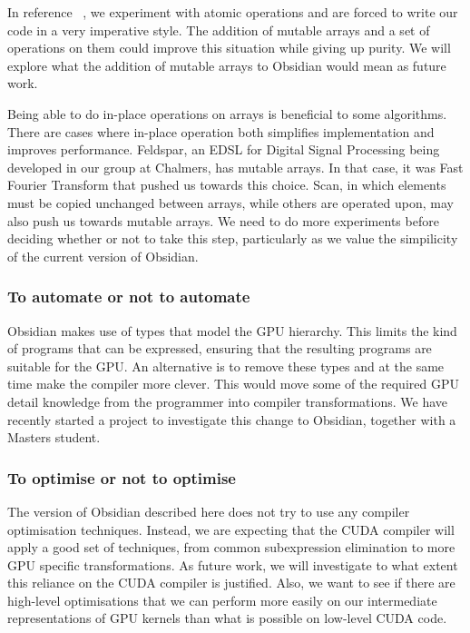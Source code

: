 In reference ~, we experiment with atomic operations 
and are forced to write our code in a very imperative style. The addition of mutable 
arrays and a set of operations on them could improve this situation 
while giving up purity. We will explore what the addition of mutable arrays to 
Obsidian would mean as future work. 

Being able to do in-place operations on arrays is beneficial to some algorithms. 
There are cases where in-place operation both simplifies implementation and improves performance.
Feldspar, an EDSL for Digital Signal Processing being developed in our group at Chalmers, has mutable arrays. In that case, it was Fast Fourier Transform
that pushed us towards this choice. Scan, in which elements must be copied
unchanged between arrays, while others are operated upon, may also push us towards mutable arrays. We need
to do more experiments before deciding whether or not to take this step,
particularly as we value the simpilicity of the current version of Obsidian.

\subsubsection{To automate or not to automate} 
Obsidian makes use of types that model the GPU hierarchy. This limits 
the kind of programs that can be expressed, ensuring that the resulting programs are
suitable for the GPU. An alternative is to remove these types and at the 
same time make the compiler more clever. This would move some of the 
required GPU detail knowledge from the programmer into compiler transformations. 
We have recently started a project to investigate this change to Obsidian,
together with a Masters student. 

\subsubsection{To optimise or not to optimise} 
The version of Obsidian described here does not try to use any compiler 
optimisation techniques. Instead, we are expecting that the 
CUDA compiler will apply a good set of techniques, from common subexpression 
elimination to more GPU specific transformations. As future work, we 
will investigate to what extent this reliance on the CUDA
compiler is justified. Also, we want to 
see if there are high-level optimisations that we can perform more easily 
on our intermediate representations of GPU kernels than what is possible 
on low-level CUDA code. 

